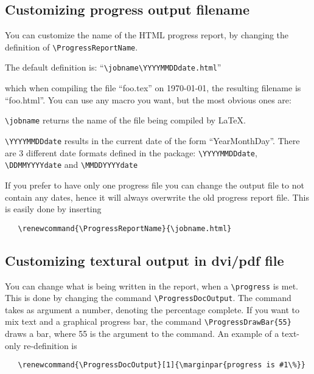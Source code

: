 \documentclass{article}
\begin{document}
\subsection{Customizing progress output filename}
You can customize the name of the HTML progress report, by changing the definition of  \verb|\ProgressReportName|.

\medskip
The default definition is:  ``\verb|\jobname\YYYYMMDDdate.html|''



which when compiling the file ``foo.tex'' on \today{}, the resulting filename is ``foo\YYYYMMDDdate .html''. You can use any macro you want, but the most obvious ones are:

\verb|\jobname| returns the name of the file being compiled by \LaTeX{}.

\verb|\YYYYMMDDdate| results in the current date of the form ``YearMonthDay''. There are 3 different date formats defined in the package:
\verb|\YYYYMMDDdate|,
\verb|\DDMMYYYYdate|
and \verb|\MMDDYYYYdate|

If you prefer to have only one progress file you can change the output file to not contain any dates, hence it will always overwrite the old progress report file. This is easily done by inserting

\verb|   \renewcommand{\ProgressReportName}{\jobname.html}|



\subsection{Customizing textural output in dvi/pdf file}
You can change what is being written in the report, when a \verb|\progress| is met. This is done by changing the command  \verb|\ProgressDocOutput|. The command takes as argument a number, denoting the percentage complete.
If you want to mix text and a graphical progress bar, the command  \verb|\ProgressDrawBar{55}| draws a bar, where 55 is the argument to the command. An example of a text-only re-definition is

\verb|   \renewcommand{\ProgressDocOutput}[1]{\marginpar{progress is #1\%}}|
\end{document}
